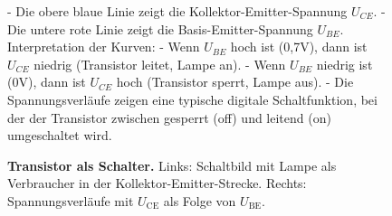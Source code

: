 {\begin{figure}[H]
\begin{minipage}[c]{0.5\textwidth}
{                - Die obere blaue Linie zeigt die Kollektor-Emitter-Spannung \( U_{CE} \).
                - Die untere rote Linie zeigt die Basis-Emitter-Spannung \( U_{BE} \).
                Interpretation der Kurven:
                - Wenn \( U_{BE} \) hoch ist (0,7V), dann ist \( U_{CE} \) niedrig (Transistor leitet, Lampe an).
                - Wenn \( U_{BE} \) niedrig ist (0V), dann ist \( U_{CE} \) hoch (Transistor sperrt, Lampe aus).
                - Die Spannungsverläufe zeigen eine typische digitale Schaltfunktion, bei der der Transistor zwischen gesperrt (off) und leitend (on) umgeschaltet wird.}
        \end{minipage}
        \label{fig:TransistorAlsSchalter}
        \caption{\textbf{Transistor als Schalter.} Links: Schaltbild mit Lampe als Verbraucher in der Kollektor-Emitter-Strecke. Rechts:
            Spannungsverläufe mit $U_\mathrm{CE}$ als Folge von $U_\mathrm{BE}$.}
    \end{figure}
}




